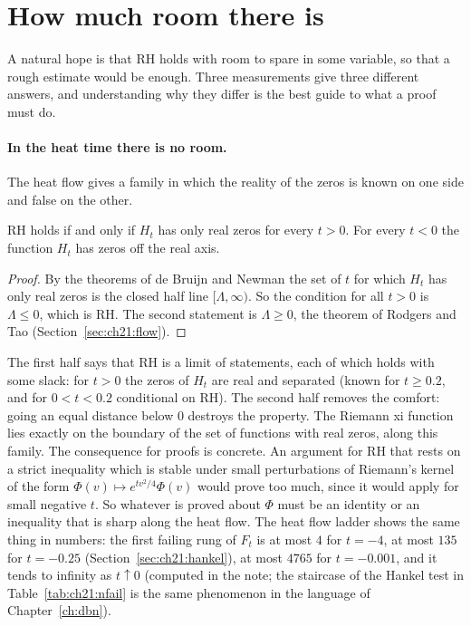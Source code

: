 \section{How much room there is}\label{d:sec:room}

A natural hope is that RH holds with room to spare in some variable, so that a rough estimate would be enough. Three measurements give three different answers, and understanding why they differ is the best guide to what a proof must do.

\paragraph{In the heat time there is no room.} The heat flow gives a family in which the reality of the zeros is known on one side and false on the other.

\begin{proposition}\label{d:prop:closed}
RH holds if and only if $H_t$ has only real zeros for every $t>0$. For every $t<0$ the function $H_t$ has zeros off the real axis.
\end{proposition}

\begin{proof}
By the theorems of de Bruijn and Newman \cite{deBruijn,Newman1976} the set of $t$ for which $H_t$ has only real zeros is the closed half line $[\Lambda,\infty)$. So the condition for all $t>0$ is $\Lambda\le0$, which is RH. The second statement is $\Lambda\ge0$, the theorem of Rodgers and Tao (Section~\ref{sec:ch21:flow}).
\end{proof}

The first half says that RH is a limit of statements, each of which holds with some slack: for $t>0$ the zeros of $H_t$ are real and separated (known for $t\ge0.2$, and for $0<t<0.2$ conditional on RH). The second half removes the comfort: going an equal distance below $0$ destroys the property. The Riemann xi function lies exactly on the boundary of the set of functions with real zeros, along this family.
The consequence for proofs is concrete. An argument for RH that rests on a strict inequality which is stable under small perturbations of Riemann's kernel of the form $\Phi(v)\mapsto e^{tv^2/4}\Phi(v)$ would prove too much, since it would apply for small negative $t$. So whatever is proved about $\Phi$ must be an identity or an inequality that is sharp along the heat flow. The heat flow ladder shows the same thing in numbers: the first failing rung of $F_t$ is at most $4$ for $t=-4$, at most $135$ for $t=-0.25$ (Section~\ref{sec:ch21:hankel}), at most $4765$ for $t=-0.001$, and it tends to infinity as $t\uparrow0$ (computed in the note; the staircase of the Hankel test in Table~\ref{tab:ch21:nfail} is the same phenomenon in the language of Chapter~\ref{ch:dbn}).

